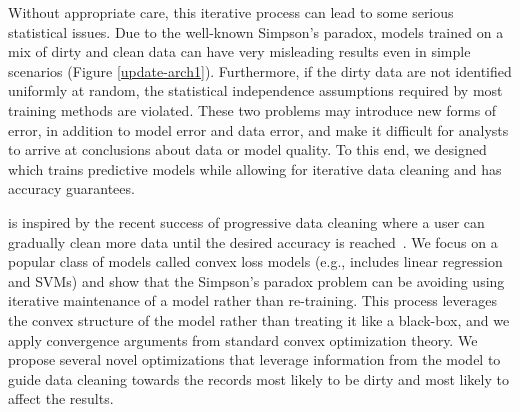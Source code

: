 Without appropriate care, this iterative process can lead to some serious statistical issues.
Due to the well-known Simpson's paradox, models trained on a mix of dirty and clean data can have very misleading results even in simple scenarios (Figure \ref{update-arch1}).
Furthermore, if the dirty data are not identified uniformly at random, the statistical independence assumptions required by most training methods are violated. 
These two problems may introduce new forms of error, in addition to model error and data error, and make it difficult for analysts to arrive at conclusions about data or model quality.
To this end, we designed \sys which trains predictive models while allowing for iterative data cleaning and has accuracy guarantees.

\sys is inspired by the recent success of progressive data cleaning where a user can gradually clean more data until the desired accuracy is reached~\cite{altowim2014progressive, whang2014incremental, papenbrock2015progressive, gruenheid2014incremental, mayfield2010eracer, DBLP:journals/pvldb/YakoutENOI11, yakout2013don}.
We focus on a popular class of models called convex loss models (e.g., includes linear regression and SVMs) and show that the Simpson's paradox problem can be avoiding using iterative maintenance of a model rather than re-training.
This process leverages the convex structure of the model rather than treating it like a black-box, and we apply convergence arguments from standard convex optimization theory.
We propose several novel optimizations that leverage information from the model to guide data cleaning towards the records most likely to be dirty and most likely to affect the results.









